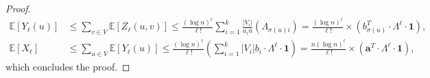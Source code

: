 \documentclass[10pt,a4paper]{amsart}
\newcommand\bE{{\mathbb E}}
\begin{document}
\begin{proof}
\begin{equation*}
    \begin{split}
        \bE[Y_\ell(u)] &\leq \sum_{v\in V} \bE[Z_\ell(u,v)] \leq \frac{(\log n)^\ell}{\ell!}\sum_{i=1}^k \frac{|V_i|}{a_i n} (\Lambda_{\sigma(u)i}) = \frac{(\log n)^\ell }{\ell!} \times (b_{\sigma(u)}^T \cdot \Lambda^\ell \cdot \boldsymbol{1}) , \\
        \bE[X_\ell] &\leq \sum_{u \in V}\bE[Y_{\ell}(u)] \leq \frac{(\log n)^\ell}{\ell!} \left(\sum_{i=1}^k |V_i|b_i \cdot \Lambda^\ell \cdot \boldsymbol{1} \right)  = \frac{n (\log n)^\ell }{\ell!} \times (\boldsymbol{a}^T \cdot \Lambda^\ell \cdot \boldsymbol{1}),
    \end{split}
\end{equation*}
which concludes the proof.
\end{proof}
\end{document}
